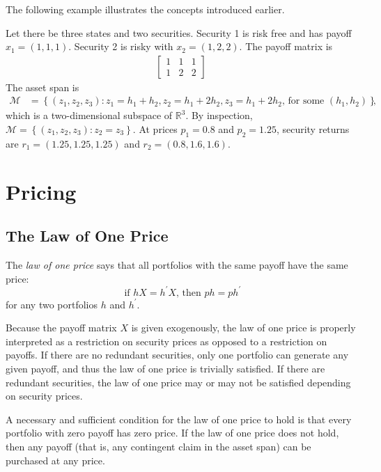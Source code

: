 \documentclass[\topdir/lecture\_notes.tex]{subfiles}
\begin{document}
The following example illustrates the concepts introduced earlier.
\begin{example} \label{ex:payoff_matrix_example}
Let there be three states and two securities. Security 1 is risk free and has payoff $x_{1}=(1,1,1)$. Security 2 is risky with $x_{2}=(1,2,2)$. The payoff matrix is
\begin{align*}
\left[\begin{array}{lll}
1 & 1 & 1 \\
1 & 2 & 2
\end{array}\right]
\end{align*}
The asset span is
\begin{align*}
\mathcal{M}&=\left\{(z_{1}, z_{2}, z_{3}): z_{1}=h_{1}+h_{2}, z_{2}=h_{1}+2 h_{2}, z_{3}=h_{1}+2 h_{2}\text{, for some }(h_{1}, h_{2})\right\},
\end{align*}
which is a two-dimensional subspace of $\mathbb{R}^{3}$. By inspection, $\mathcal{M}=\left\{\left(z_{1}, z_{2}, z_{3}\right): z_{2}=z_{3}\right\}$. At prices $p_{1}=0.8$ and $p_{2}=1.25$, security returns are $r_{1}=(1.25,1.25,1.25)$ and $r_{2}=(0.8,1.6,1.6)$.
\end{example}

\section{Pricing}
\subsection{The Law of One Price}
The \emph{law of one price} says that all portfolios with the same payoff have the same price:
\begin{equation*}
\text { if } h X=h^{\prime} X \text {, then } p h=p h^{\prime}
\end{equation*}
for any two portfolios $h$ and $h^{\prime}$.

Because the payoff matrix $X$ is given exogenously, the law of one price is properly interpreted as a restriction on security prices as opposed to a restriction on payoffs. If there are no redundant securities, only one portfolio can generate any given payoff, and thus the law of one price is trivially satisfied. If there are redundant securities, the law of one price may or may not be satisfied depending on security prices.

A necessary and sufficient condition for the law of one price to hold is that every portfolio with zero payoff has zero price. If the law of one price does not hold, then any payoff (that is, any contingent claim in the asset span) can be purchased at any price.
\end{document}
